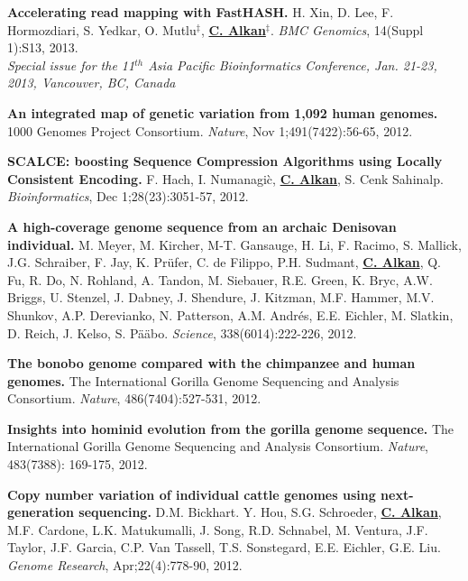\documentclass[margin,line]{res}
\begin{document}
\begin{resume}
 \vspace{-.2cm}
        {\bf Accelerating read mapping with FastHASH.}
        H. Xin, D. Lee, F. Hormozdiari, S. Yedkar, O. Mutlu$^\ddag$, {\bf {\underline {C. Alkan}}}$^\ddag$.
        {\em BMC Genomics}, 14(Suppl 1):S13, 2013.\\
        \hspace*{1cm} {\footnotesize {\it Special issue for the 11$^{th}$  Asia Pacific Bioinformatics Conference,
            Jan. 21-23, 2013, Vancouver, BC, Canada}}
        
 \vspace{-.2cm}
        {\bf An integrated map of genetic variation from 1,092 human genomes.}
        1000 Genomes Project Consortium. 
        {\em Nature}, Nov 1;491(7422):56-65, 2012.
        
 \vspace{-.2cm}
        {\bf SCALCE: boosting Sequence Compression Algorithms using Locally Consistent Encoding.}
        F. Hach, I. Numanagi\`{c}, {\bf {\underline {C. Alkan}}}, S. Cenk Sahinalp.  
        {\em Bioinformatics}, Dec 1;28(23):3051-57, 2012.

 \vspace{-.2cm}
        {\bf A high-coverage genome sequence from an archaic Denisovan individual.}
        M. Meyer, M. Kircher, M-T. Gansauge, H. Li, F. Racimo, S. Mallick, J.G. Schraiber, F. Jay, K. Pr\"{u}fer, C. de Filippo, P.H. Sudmant, 
        {\bf {\underline {C. Alkan}}}, Q. Fu, R. Do, N. Rohland, A. Tandon, M. Siebauer, R.E. Green, 
        K. Bryc, A.W. Briggs, U. Stenzel, J. Dabney, J. Shendure, J. Kitzman, M.F. Hammer, M.V. Shunkov, 
        A.P. Derevianko, N. Patterson, A.M. Andr\'{e}s, E.E. Eichler, M. Slatkin, D. Reich, J. Kelso, S. P\"{a}\"{a}bo. 
        {\em Science}, 338(6014):222-226, 2012.

 \vspace{-.2cm}
        {\bf The bonobo genome compared with the chimpanzee and human genomes.}
        The International Gorilla Genome Sequencing and Analysis Consortium.
        {\em Nature}, 486(7404):527-531, 2012.

\vspace{-.2cm}
{\bf Insights into hominid evolution from the gorilla genome sequence.}
The International Gorilla Genome Sequencing and Analysis Consortium.
{\em Nature}, 483(7388): 169-175, 2012. 


\vspace{-.2cm}
{\bf Copy number variation of individual cattle genomes using next-generation sequencing.} 
D.M. Bickhart. Y. Hou, S.G. Schroeder, {\bf {\underline {C. Alkan}}}, M.F. Cardone, L.K. Matukumalli, J. Song, 
R.D. Schnabel, M. Ventura, J.F. Taylor, J.F. Garcia, C.P. Van Tassell, T.S. Sonstegard, E.E. Eichler, G.E. Liu. 
{\em Genome Research}, Apr;22(4):778-90, 2012.


\end{resume}
\end{document}
